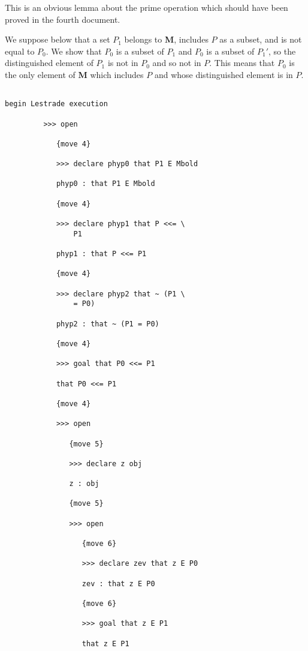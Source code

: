 \documentclass[12pt]{article}
\begin{document}
This is an obvious lemma about the prime operation which should have been proved in the fourth document.  

We suppose below that a set $P_1$ belongs to {\bf M}, includes $P$ as a subset, and is not equal to $P_0$.  We show that $P_0$ is a subset of $P_1$
and $P_0$ is a subset of $P_1'$, so the distinguished element of $P_1$ is not in $P_0$ and so not in $P$.  This means that $P_0$ is the only element of {\bf M} which includes $P$ and whose distinguished element is in $P$.

\begin{verbatim}

begin Lestrade execution

         >>> open

            {move 4}

            >>> declare phyp0 that P1 E Mbold

            phyp0 : that P1 E Mbold

            {move 4}

            >>> declare phyp1 that P <<= \
                P1

            phyp1 : that P <<= P1

            {move 4}

            >>> declare phyp2 that ~ (P1 \
                = P0)

            phyp2 : that ~ (P1 = P0)

            {move 4}

            >>> goal that P0 <<= P1

            that P0 <<= P1

            {move 4}

            >>> open

               {move 5}

               >>> declare z obj

               z : obj

               {move 5}

               >>> open

                  {move 6}

                  >>> declare zev that z E P0

                  zev : that z E P0

                  {move 6}

                  >>> goal that z E P1

                  that z E P1


\end{verbatim}
\end{document}
